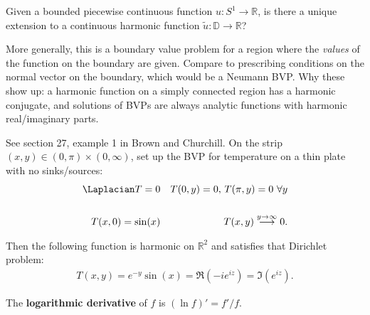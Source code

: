 \begin{definition}

Given a bounded piecewise continuous function \(u:S^1\to {\mathbb{R}}\),
is there a unique extension to a continuous harmonic function
\(\tilde u: {\mathbb{D}}\to {\mathbb{R}}\)?

\end{definition}

\begin{remark}

More generally, this is a boundary value problem for a region where the
\emph{values} of the function on the boundary are given. Compare to
prescribing conditions on the normal vector on the boundary, which would
be a Neumann BVP. Why these show up: a harmonic function on a simply
connected region has a harmonic conjugate, and solutions of BVPs are
always analytic functions with harmonic real/imaginary parts.

\end{remark}

\begin{example}

See section 27, example 1 in Brown and Churchill. On the strip
\((x, y)\in (0, \pi) \times(0, \infty)\), set up the BVP for temperature
on a thin plate with no sinks/sources:
\begin{align*}
\Laplacian T = 0 && T(0, y) = 0,\, T(\pi, y) = 0 \,\,\forall y \\ \\
T(x, 0) = \sin(x) && T(x, y) \overset{y\to\infty}\longrightarrow 0
.\end{align*}

Then the following function is harmonic on \({\mathbb{R}}^2\) and
satisfies that Dirichlet problem:
\begin{align*}
T(x ,y) = e^{-y} \sin(x) = \Re(-ie^{iz}) = \Im(e^{iz})
.\end{align*}

\end{example}

\begin{definition}

The \textbf{logarithmic derivative} of \(f\) is \((\ln f)' = f'/f\).

\end{definition}

